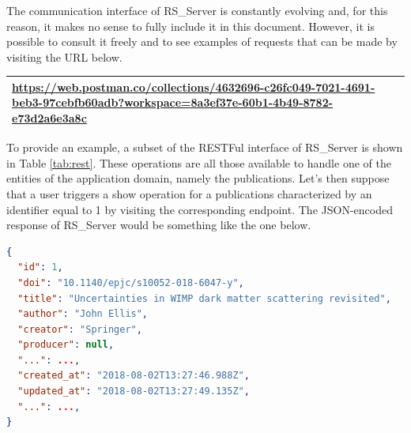 \documentclass[a4paper, english]{article}
\begin{document}
The communication interface of RS\_Server is constantly evolving and, for this reason, it makes no sense to fully include it in this document. However, it is possible to consult it freely and to see examples of requests that can be made by visiting the URL below.

\begin{table}[h]
\centering
\begin{tabular}{p{12cm}}
  \toprule
	\url{https://web.postman.co/collections/4632696-c26fc049-7021-4691-beb3-97cebfb60adb?workspace=8a3ef37e-60b1-4b49-8782-e73d2a6e3a8c}  \\
 \toprule
  \end{tabular}
\end{table}

To provide an example, a subset of the RESTFul interface of RS\_Server is shown in Table \ref{tab:rest}. These operations are all those available to handle one of the entities of the application domain, namely the publications. Let's then suppose that a user triggers a show operation for a publications characterized by an identifier equal to 1 by visiting the corresponding endpoint. The JSON-encoded response of RS\_Server would be something like the one below.

\begin{lstlisting}[language=json,firstnumber=1]
{
  "id": 1,
  "doi": "10.1140/epjc/s10052-018-6047-y",
  "title": "Uncertainties in WIMP dark matter scattering revisited",
  "author": "John Ellis",
  "creator": "Springer",
  "producer": null,
  "...": ...,
  "created_at": "2018-08-02T13:27:46.988Z",
  "updated_at": "2018-08-02T13:27:49.135Z",
  "...": ...,
}
\end{lstlisting}
\end{document}
